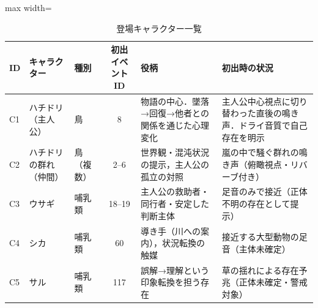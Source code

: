 
\begin{table}[t]
    \centering
    \caption{登場キャラクター一覧}
    \label{tab:characters}
    \begin{adjustbox}{max width=\textwidth}
        \begin{tabular}{lllcll}
            \hline
            ID & キャラクター      & 種別    & 初出イベントID & 役柄                         & 初出時の状況                             \\
            \hline
            C1 & ハチドリ（主人公）   & 鳥     & 8        & 物語の中心．墜落→回復→他者との関係を通じた心理変化 & 主人公中心視点に切り替わった直後の鳴き声．ドライ音質で自己存在を明示 \\
            C2 & ハチドリの群れ（仲間） & 鳥（複数） & 2--6     & 世界観・混沌状況の提示，主人公の孤立の対照      & 嵐の中で騒ぐ群れの鳴き声（俯瞰視点・リバーブ付き）          \\
            C3 & ウサギ         & 哺乳類   & 18--19   & 主人公の救助者・同行者・安定した判断主体       & 足音のみで接近（正体不明の存在として提示）              \\
            C4 & シカ          & 哺乳類   & 60       & 導き手（川への案内），状況転換の触媒         & 接近する大型動物の足音（主体未確定）                 \\
            C5 & サル          & 哺乳類   & 117      & 誤解→理解という印象転換を担う存在          & 草の揺れによる存在予兆（正体未確定・警戒対象）            \\
            \hline
        \end{tabular}
    \end{adjustbox}
\end{table}